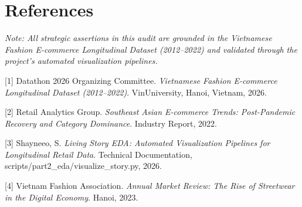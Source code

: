 \section*{References}

\textit{Note: All strategic assertions in this audit are grounded in the Vietnamese Fashion E-commerce Longitudinal Dataset (2012--2022) and validated through the project's automated visualization pipelines.}

\medskip

{
\small

[1] Datathon 2026 Organizing Committee. \textit{Vietnamese Fashion E-commerce Longitudinal Dataset (2012--2022)}. VinUniversity, Hanoi, Vietnam, 2026.

[2] Retail Analytics Group. \textit{Southeast Asian E-commerce Trends: Post-Pandemic Recovery and Category Dominance}. Industry Report, 2022.

[3] Shayneeo, S. \textit{Living Story EDA: Automated Visualization Pipelines for Longitudinal Retail Data}. Technical Documentation, scripts/part2\_eda/visualize\_story.py, 2026.

[4] Vietnam Fashion Association. \textit{Annual Market Review: The Rise of Streetwear in the Digital Economy}. Hanoi, 2023.

}
